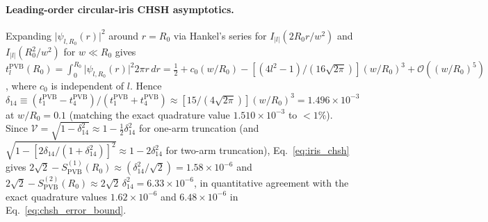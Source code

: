 \documentclass[aps,pra,reprint,nofootinbib,floatfix,longbibliography]{revtex4-2}
\newcommand{\abs}[1]{\lvert #1 \rvert}
\begin{document}
\paragraph*{Leading-order circular-iris CHSH asymptotics.}
Expanding $\abs{\psi_{l,R_0}(r)}^2$ around $r = R_0$ via Hankel's series for $I_{\abs{l}}(2R_0 r/w^2)$ and $I_{\abs{l}}(R_0^2/w^2)$ for $w \ll R_0$ gives $t_l^{\mathrm{PVB}}(R_0) = \int_0^{R_0}\abs{\psi_{l,R_0}(r)}^2 2\pi r\,dr = \frac{1}{2} + c_0(w/R_0) - [(4l^2 - 1)/(16\sqrt{2\pi})](w/R_0)^3 + \mathcal{O}((w/R_0)^5)$, where $c_0$ is independent of $l$. Hence $\delta_{14} \equiv (t_1^{\mathrm{PVB}} - t_4^{\mathrm{PVB}})/(t_1^{\mathrm{PVB}} + t_4^{\mathrm{PVB}}) \approx [15/(4\sqrt{2\pi})](w/R_0)^3 = 1.496\times 10^{-3}$ at $w/R_0 = 0.1$ (matching the exact quadrature value $1.510\times 10^{-3}$ to $<1\%$). Since $\mathcal{V} = \sqrt{1 - \delta_{14}^2} \approx 1 - \frac{1}{2}\delta_{14}^2$ for one-arm truncation (and $\sqrt{1 - [2\delta_{14}/(1+\delta_{14}^2)]^2} \approx 1 - 2\delta_{14}^2$ for two-arm truncation), Eq.~\eqref{eq:iris_chsh} gives $2\sqrt{2} - S_{\mathrm{PVB}}^{(1)}(R_0) \approx (\delta_{14}^2/\sqrt{2}) = 1.58\times 10^{-6}$ and $2\sqrt{2} - S_{\mathrm{PVB}}^{(2)}(R_0) \approx 2\sqrt{2}\,\delta_{14}^2 = 6.33\times 10^{-6}$, in quantitative agreement with the exact quadrature values $1.62\times 10^{-6}$ and $6.48\times 10^{-6}$ in Eq.~\eqref{eq:chsh_error_bound}.


\end{document}

